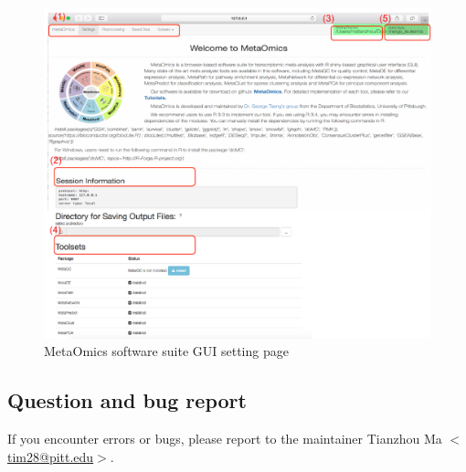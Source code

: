 \begin{figure}[H]
\begin{center}
\includegraphics[scale=0.9]{./figure/preprocessing/GUIsetting}
\caption{MetaOmics software suite GUI setting page}
\label{fig:GUIsetting}
\end{center}
\end{figure}


\subsection{Question and bug report}

If you encounter errors or bugs, please report to the maintainer Tianzhou Ma $<$\url{tim28@pitt.edu}$>$.


 
